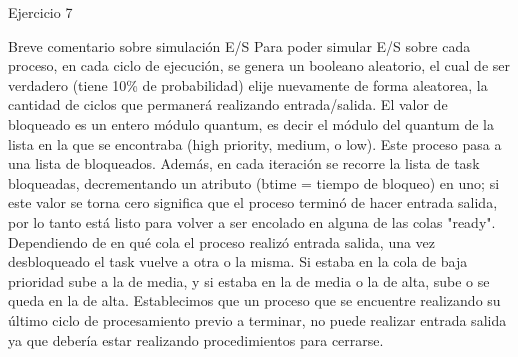 
\begin{section}{Ejercicio 7}

\begin{subsection}{Breve comentario sobre simulación E/S}
	Para poder simular E/S sobre cada proceso, en cada ciclo de ejecución, se genera un booleano aleatorio, el cual de ser verdadero (tiene 10\% de probabilidad) elije nuevamente de forma aleatorea, la cantidad de ciclos que permanerá realizando entrada/salida. El valor de bloqueado es un entero módulo quantum, es decir el módulo del quantum de la lista en la que se encontraba (high priority, medium, o low). Este proceso pasa a una lista de bloqueados.
	Además, en cada iteración se recorre la lista de task bloqueadas, decrementando un atributo (btime = tiempo de bloqueo) en uno; si este valor se torna cero significa que el proceso terminó de hacer entrada salida, por lo tanto está listo para volver a ser encolado en alguna de las colas "ready". Dependiendo de en qué cola el proceso realizó entrada salida, una vez desbloqueado el task vuelve a otra o la misma. Si estaba en la cola de baja prioridad sube a la de media, y si estaba en la de media o la de alta, sube o se queda en la de alta.
	Establecimos que un proceso que se encuentre realizando su último ciclo de procesamiento previo a terminar, no puede realizar entrada salida ya que debería estar realizando procedimientos para cerrarse.
\end{subsection}

\end{section}

